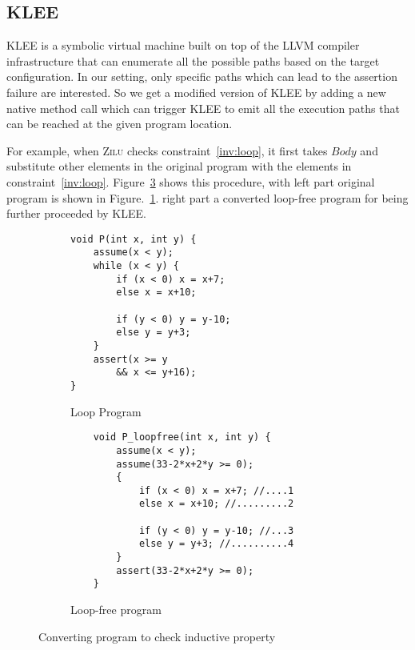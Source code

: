 



\subsection{KLEE}
\label{subsec:klee}
KLEE is a symbolic virtual machine built on top of the LLVM compiler infrastructure
that can enumerate all the possible paths based on the target configuration.
In our setting, only specific paths which can lead to the assertion failure are interested.
So we get a modified version of KLEE by adding a new native method call
which can trigger KLEE to emit all the execution paths that can be reached at the given program location.

For example, when \textsc{Zilu} checks constraint~\ref{inv:loop},
it first takes $Body$ and substitute other elements in the original program with the elements in constraint~\ref{inv:loop}.
Figure~\ref{fig:klee:program} shows this procedure,
with left part original program is shown in Figure.~\ref{fig:klee:program:in}.
right part a converted loop-free program for being further proceeded by KLEE.

\begin{figure}[!h]
\begin{subfigure}{0.19\textwidth}
    \centering
    {\scriptsize\begin{verbatim}
void P(int x, int y) {
    assume(x < y);
    while (x < y) {
        if (x < 0) x = x+7;
        else x = x+10;

        if (y < 0) y = y-10;
        else y = y+3;
    }
    assert(x >= y
        && x <= y+16);
}
    \end{verbatim}}
    \vspace{-5mm}
    \caption{Loop Program}
    \label{fig:klee:program:in}
\end{subfigure}%
\begin{subfigure}{.19\textwidth}
      \centering
      \vspace{-0.1cm}
        {\scriptsize\begin{verbatim}
    void P_loopfree(int x, int y) {
        assume(x < y);
        assume(33-2*x+2*y >= 0);
        {
            if (x < 0) x = x+7; //....1
            else x = x+10; //.........2

            if (y < 0) y = y-10; //...3
            else y = y+3; //..........4
        }
        assert(33-2*x+2*y >= 0);
    }
    \end{verbatim}}
    \vspace{-5mm}
    \caption{Loop-free program}
      \label{fig:klee:program:out}
\end{subfigure}
\caption{Converting program to check inductive property}
\label{fig:klee:program}
\end{figure}

